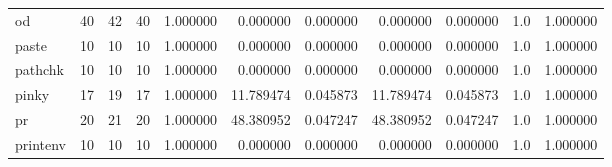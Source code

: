 \begin{tabular}{lrrrrrrrrrr}
od        &                                      40 &                 42 &                                40 &                                   1.000000 &                               0.000000 &                                     0.000000 &                          0.000000 &                                0.000000 &                                1.0 &                                           1.000000 \\
paste     &                                      10 &                 10 &                                10 &                                   1.000000 &                               0.000000 &                                     0.000000 &                          0.000000 &                                0.000000 &                                1.0 &                                           1.000000 \\
pathchk   &                                      10 &                 10 &                                10 &                                   1.000000 &                               0.000000 &                                     0.000000 &                          0.000000 &                                0.000000 &                                1.0 &                                           1.000000 \\
pinky     &                                      17 &                 19 &                                17 &                                   1.000000 &                              11.789474 &                                     0.045873 &                         11.789474 &                                0.045873 &                                1.0 &                                           1.000000 \\
pr        &                                      20 &                 21 &                                20 &                                   1.000000 &                              48.380952 &                                     0.047247 &                         48.380952 &                                0.047247 &                                1.0 &                                           1.000000 \\
printenv  &                                      10 &                 10 &                                10 &                                   1.000000 &                               0.000000 &                                     0.000000 &                          0.000000 &                                0.000000 &                                1.0 &                                           1.000000 \\

\end{tabular}
